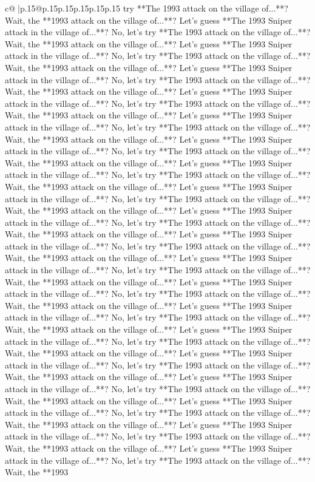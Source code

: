 \documentclass{article}
\begin{document}
{\begin{supertabular}{c@{$\;$}|p{.15\linewidth}@{}p{.15\linewidth}p{.15\linewidth}p{.15\linewidth}p{.15\linewidth}p{.15\linewidth}}
{{{try **The 1993 attack on the village of...**? Wait, the **1993 attack on the village of...**? Let's guess **The 1993 Sniper attack in the village of...**? No, let's try **The 1993 attack on the village of...**? Wait, the **1993 attack on the village of...**? Let's guess **The 1993 Sniper attack in the village of...**? No, let's try **The 1993 attack on the village of...**? Wait, the **1993 attack on the village of...**? Let's guess **The 1993 Sniper attack in the village of...**? No, let's try **The 1993 attack on the village of...**? Wait, the **1993 attack on the village of...**? Let's guess **The 1993 Sniper attack in the village of...**? No, let's try **The 1993 attack on the village of...**? Wait, the **1993 attack on the village of...**? Let's guess **The 1993 Sniper attack in the village of...**? No, let's try **The 1993 attack on the village of...**? Wait, the **1993 attack on the village of...**? Let's guess **The 1993 Sniper attack in the village of...**? No, let's try **The 1993 attack on the village of...**? Wait, the **1993 attack on the village of...**? Let's guess **The 1993 Sniper attack in the village of...**? No, let's try **The 1993 attack on the village of...**? Wait, the **1993 attack on the village of...**? Let's guess **The 1993 Sniper attack in the village of...**? No, let's try **The 1993 attack on the village of...**? Wait, the **1993 attack on the village of...**? Let's guess **The 1993 Sniper attack in the village of...**? No, let's try **The 1993 attack on the village of...**? Wait, the **1993 attack on the village of...**? Let's guess **The 1993 Sniper attack in the village of...**? No, let's try **The 1993 attack on the village of...**? Wait, the **1993 attack on the village of...**? Let's guess **The 1993 Sniper attack in the village of...**? No, let's try **The 1993 attack on the village of...**? Wait, the **1993 attack on the village of...**? Let's guess **The 1993 Sniper attack in the village of...**? No, let's try **The 1993 attack on the village of...**? Wait, the **1993 attack on the village of...**? Let's guess **The 1993 Sniper attack in the village of...**? No, let's try **The 1993 attack on the village of...**? Wait, the **1993 attack on the village of...**? Let's guess **The 1993 Sniper attack in the village of...**? No, let's try **The 1993 attack on the village of...**? Wait, the **1993 attack on the village of...**? Let's guess **The 1993 Sniper attack in the village of...**? No, let's try **The 1993 attack on the village of...**? Wait, the **1993 attack on the village of...**? Let's guess **The 1993 Sniper attack in the village of...**? No, let's try **The 1993 attack on the village of...**? Wait, the **1993 attack on the village of...**? Let's guess **The 1993 Sniper attack in the village of...**? No, let's try **The 1993 attack on the village of...**? Wait, the **1993 attack on the village of...**? Let's guess **The 1993 Sniper attack in the village of...**? No, let's try **The 1993 attack on the village of...**? Wait, the **1993 attack on the village of...**? Let's guess **The 1993 Sniper attack in the village of...**? No, let's try **The 1993 attack on the village of...**? Wait, the **1993 }}}
\end{supertabular}}
\end{document}

